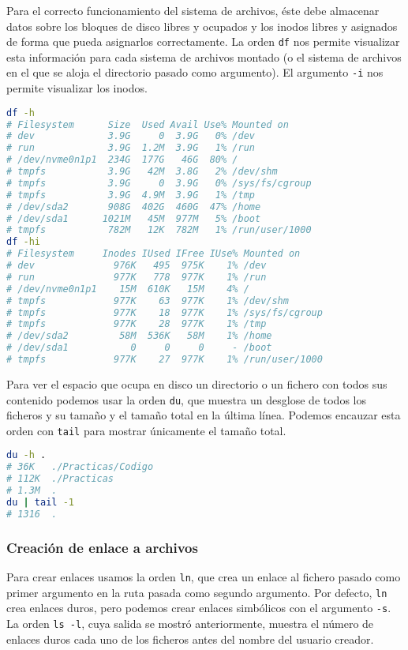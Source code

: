 Para el correcto funcionamiento del sistema de archivos, éste debe almacenar datos sobre los bloques de disco libres y ocupados y los inodos libres y asignados de forma que pueda asignarlos correctamente.
La orden \texttt{df} nos permite visualizar esta información para cada sistema de archivos montado (o el sistema de archivos en el que se aloja el directorio pasado como argumento).
El argumento \texttt{-i} nos permite visualizar los inodos.

\begin{lstlisting}[language=Bash]
df -h
# Filesystem      Size  Used Avail Use% Mounted on
# dev             3.9G     0  3.9G   0% /dev
# run             3.9G  1.2M  3.9G   1% /run
# /dev/nvme0n1p1  234G  177G   46G  80% /
# tmpfs           3.9G   42M  3.8G   2% /dev/shm
# tmpfs           3.9G     0  3.9G   0% /sys/fs/cgroup
# tmpfs           3.9G  4.9M  3.9G   1% /tmp
# /dev/sda2       908G  402G  460G  47% /home
# /dev/sda1      1021M   45M  977M   5% /boot
# tmpfs           782M   12K  782M   1% /run/user/1000
df -hi
# Filesystem     Inodes IUsed IFree IUse% Mounted on
# dev              976K   495  975K    1% /dev
# run              977K   778  977K    1% /run
# /dev/nvme0n1p1    15M  610K   15M    4% /
# tmpfs            977K    63  977K    1% /dev/shm
# tmpfs            977K    18  977K    1% /sys/fs/cgroup
# tmpfs            977K    28  977K    1% /tmp
# /dev/sda2         58M  536K   58M    1% /home
# /dev/sda1           0     0     0     - /boot
# tmpfs            977K    27  977K    1% /run/user/1000
\end{lstlisting}

Para ver el espacio que ocupa en disco un directorio o un fichero con todos sus contenido podemos usar la orden \texttt{du}, que muestra un desglose de todos los ficheros y su tamaño y el tamaño total en la última línea.
Podemos encauzar esta orden con \texttt{tail} para mostrar únicamente el tamaño total.

\begin{lstlisting}[language=Bash]
du -h .
# 36K	./Practicas/Codigo
# 112K	./Practicas
# 1.3M	.
du | tail -1
# 1316	.
\end{lstlisting}

\subsubsection{Creación de enlace a archivos}

Para crear enlaces usamos la orden \texttt{ln}, que crea un enlace al fichero pasado como primer argumento en la ruta pasada como segundo argumento.
Por defecto, \texttt{ln} crea enlaces duros, pero podemos crear enlaces simbólicos con el argumento \texttt{-s}.
La orden \texttt{ls -l}, cuya salida se mostró anteriormente, muestra el número de enlaces duros cada uno de los ficheros antes del nombre del usuario creador.

